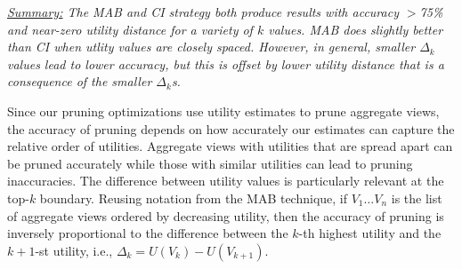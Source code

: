 {\em \underline{Summary:} The MAB and CI strategy both produce results with 
accuracy $>$75\% and near-zero utility distance for a variety of $k$ values.
MAB does slightly better than CI when utlity values are closely spaced.
However, in general, smaller $\Delta_k$ values lead to lower accuracy, but this is offset by
lower utility distance that is a consequence of the smaller $\Delta_k$s. 
}

\noindent Since our pruning optimizations use utility estimates to prune aggregate views, 
 the accuracy of pruning depends on how accurately
 our estimates can capture the relative order of utilities.
 Aggregate views with utilities that are spread apart can be pruned accurately while
 those with similar utilities can lead to pruning inaccuracies.
 The difference between utility values is particularly relevant at the top-$k$
 boundary.
 Reusing notation from the MAB technique, if $V_1 \ldots V_n$ is the list of aggregate views 
 ordered by decreasing utility, then the accuracy of pruning is inversely proportional to 
 the difference between the $k$-th highest utility and the $k+1$-st utility, 
 i.e., $\Delta_k = U(V_k) - U(V_{k+1})$.


